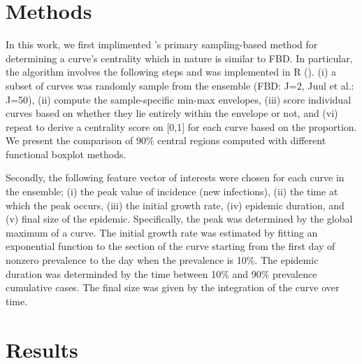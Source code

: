 \documentclass[fleqn,10pt,lineno]{wlpeerj}
\begin{document}
\section*{Methods}

In this work, we first implimented \juul's primary sampling-based method for determining a curve's centrality which in nature is similar to FBD. In particular, the algorithm involves the following steps and was implemented in R ().
(i) a subset of curves was randomly sample from the ensemble (FBD: J=2, Juul et al.: J=50), (ii) compute the sample-specific min-max envelopes, (iii) score individual curves based on whether they lie entirely within the envelope or not, and (vi) repeat to derive a centrality score on [0,1] for each curve based on the proportion. We present the comparison of 90\% central regions computed with different functional boxplot methods.

Secondly, the following feature vector of interests were chosen for each curve in the ensemble; 
(i) the peak value of incidence (new infections), 
(ii) the time at which the peak occurs, 
(iii) the initial growth rate, 
(iv) epidemic duration, and 
(v) final size of the epidemic.
Specifically, the peak was determined by the global maximum of a curve. The initial growth rate was estimated by fitting an exponential function to the section of the curve starting from the first day of nonzero prevalence to the day when the prevalence is 10\%. 
The epidemic duration was determinded by the time between 10\% and 90\% prevalence cumulative cases. The final size was given by the integration of the curve over time.



\section*{Results}
\end{document}
